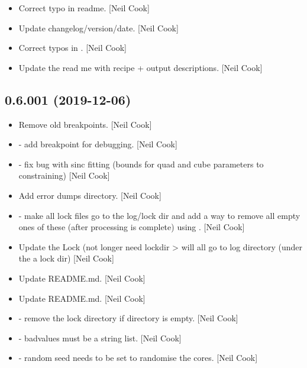 \documentclass[a4paper,10pt,english]{report}
\begin{document}
\begin{itemize}
\item {} 
Correct typo in readme. {[}Neil Cook{]}

\item {} 
Update changelog/version/date. {[}Neil Cook{]}

\item {} 
Correct typos in . {[}Neil Cook{]}

\item {} 
Update the read me with recipe + output descriptions. {[}Neil Cook{]}

\end{itemize}


\subsection{0.6.001 (2019-12-06)}
\label{\detokenize{misc/changelog:id18}}\begin{itemize}
\item {} 
Remove old breakpoints. {[}Neil Cook{]}

\item {} 
 - add breakpoint for debugging. {[}Neil Cook{]}

\item {} 
 - fix bug with sinc fitting (bounds for quad and cube
parameters to constraining) {[}Neil Cook{]}

\item {} 
Add error dumps directory. {[}Neil Cook{]}

\item {} 
 - make all lock files go to the log/lock dir and add a
way to remove all empty ones of these (after processing is complete)
using . {[}Neil Cook{]}

\item {} 
Update the Lock (not longer need lockdir \textendash{}\textgreater{} will all go to log
directory (under the a lock dir) {[}Neil Cook{]}

\item {} 
Update README.md. {[}Neil Cook{]}

\item {} 
Update README.md. {[}Neil Cook{]}

\item {} 
 - remove the lock directory if directory is empty.
{[}Neil Cook{]}

\item {} 
 - badvalues must be a string list. {[}Neil Cook{]}

\item {} 
 - random seed needs to be set to randomise
the cores. {[}Neil Cook{]}

\end{itemize}
\end{document}
